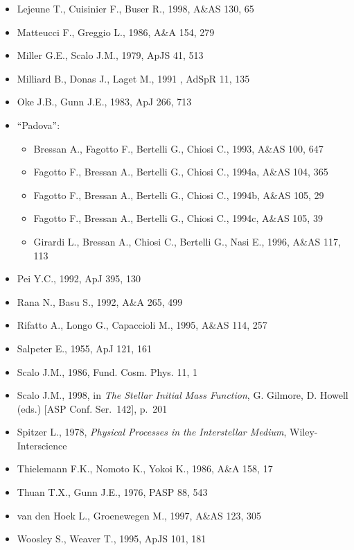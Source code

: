 \documentclass[11pt,draft,fleqn]{article}
\begin{document}
\begin{itemize}
\item[] Lejeune T., Cuisinier F., Buser R., 1998, A\&AS 130, 65
\item[] Matteucci F., Greggio L., 1986, A\&A 154, 279
\item[] Miller G.E., Scalo J.M., 1979, ApJS 41, 513
\item[] Milliard B., Donas J., Laget M., 1991 , AdSpR 11, 135
\item[] Oke J.B., Gunn J.E., 1983, ApJ 266, 713
\item[] ``Padova'': 
\begin{itemize}
\item Bressan A., Fagotto F., Bertelli G., Chiosi C., 1993, A\&AS 100, 647
\item Fagotto F., Bressan A., Bertelli G., Chiosi C., 1994a, A\&AS 104, 365
\item Fagotto F., Bressan A., Bertelli G., Chiosi C., 1994b, A\&AS 105, 29
\item Fagotto F., Bressan A., Bertelli G., Chiosi C., 1994c, A\&AS 105, 39
\item Girardi L., Bressan A., Chiosi C., Bertelli G., Nasi E., 1996, A\&AS 117, 113
\end{itemize}
\item[] Pei Y.C., 1992, ApJ 395, 130
\item[] Rana N., Basu S., 1992, A\&A 265, 499
\item[] Rifatto A., Longo G., Capaccioli M., 1995, A\&AS 114, 257
\item[] Salpeter E., 1955, ApJ 121, 161
\item[] Scalo J.M., 1986, Fund. Cosm. Phys. 11, 1 
\item[] Scalo J.M., 1998, in \emph{The Stellar Initial Mass Function},
G. Gilmore, D. Howell (eds.) [ASP Conf. Ser.~142], p.~201
\item[] Spitzer L., 1978, \emph{Physical Processes in the Interstellar Medium},
Wiley-Interscience
\item[] Thielemann F.K., Nomoto K., Yokoi K., 1986, A\&A 158, 17
\item[] Thuan T.X., Gunn J.E., 1976, PASP 88, 543
\item[] van den Hoek L., Groenewegen M., 1997, A\&AS 123, 305
\item[] Woosley S., Weaver T., 1995, ApJS 101, 181
\end{itemize}
\end{document}
